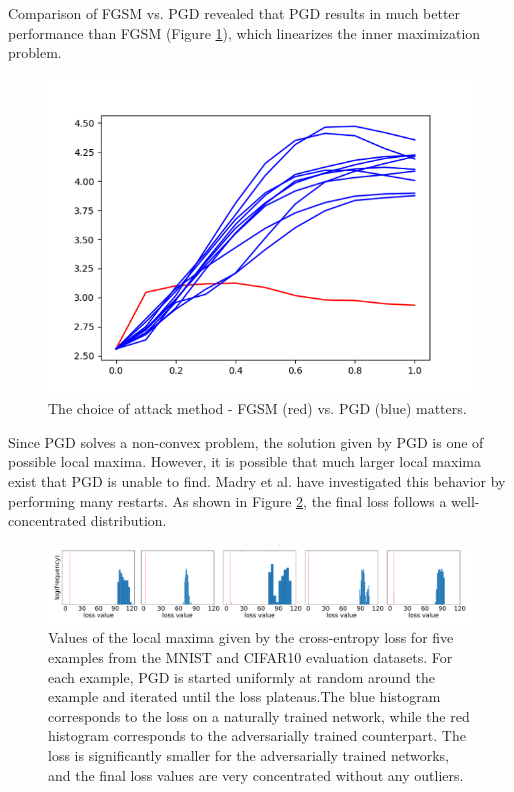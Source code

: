 \documentclass[10pt]{article}
\begin{document}
Comparison of FGSM vs. PGD revealed that PGD results in much better performance than FGSM (Figure \ref{fig:pgd_fgsm}), which linearizes the inner maximization problem.
\begin{figure}[!h]
\centering
\includegraphics[width=0.5\linewidth]{pgd_fgsm}
\caption{The choice of attack method - FGSM (red) vs. PGD (blue) matters.}
\label{fig:pgd_fgsm}
\end{figure}

Since PGD solves a non-convex problem, the solution given by PGD is one of possible local maxima. However, it is possible that much larger local maxima exist that PGD is unable to find. Madry et al. have investigated this behavior by performing many restarts. As shown in Figure \ref{fig:local_maxima}, the final loss follows a well-concentrated distribution.

\begin{figure}[!h]
\centering
\includegraphics[width=0.9\linewidth]{dist_local_maxima}
\caption{Values of the local maxima given by the cross-entropy loss for five examples from the
MNIST and CIFAR10 evaluation datasets. For each example, PGD is started uniformly at random around the example and iterated until the loss plateaus.The blue histogram corresponds to the loss on a naturally trained network, while
the red histogram corresponds to the adversarially trained counterpart. The loss is significantly
smaller for the adversarially trained networks, and the final loss values are very concentrated without
any outliers.}
\label{fig:local_maxima}
\end{figure}
\end{document}
